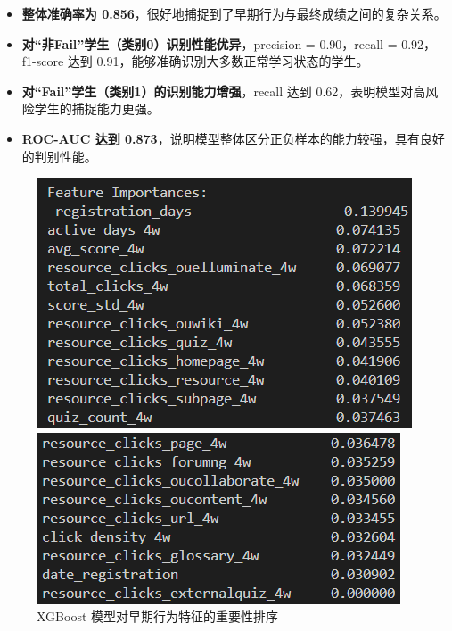 \documentclass{SYSUReport}
\begin{document}
\begin{itemize}
    \item \textbf{整体准确率为 0.856}，很好地捕捉到了早期行为与最终成绩之间的复杂关系。
    \item \textbf{对“非Fail”学生（类别0）识别性能优异}，precision = 0.90，recall = 0.92，f1-score 达到 0.91，能够准确识别大多数正常学习状态的学生。
    \item \textbf{对“Fail”学生（类别1）的识别能力增强}，recall 达到 0.62，表明模型对高风险学生的捕捉能力更强。
    \item \textbf{ROC-AUC 达到 0.873}，说明模型整体区分正负样本的能力较强，具有良好的判别性能。
\end{itemize}

\begin{figure}[htbp]
    \centering
    \begin{minipage}[b]{0.48\textwidth}
        \centering
        \includegraphics[width=\linewidth]{figures/xgb_features1.png}
    \end{minipage}
    \hfill
    \begin{minipage}[b]{0.48\textwidth}
        \centering
        \includegraphics[width=\linewidth]{figures/xgb_features2.png}
    \end{minipage}
    \caption{XGBoost 模型对早期行为特征的重要性排序}
    \label{fig:xgb_feature_importance}
\end{figure}
\end{document}
